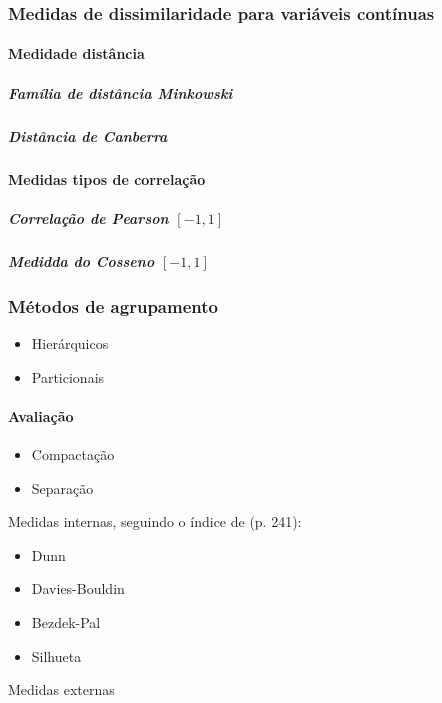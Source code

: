 \subsubsection{Medidas de dissimilaridade para variáveis contínuas}

\paragraph*{Medidade distância}
\subparagraph*{Família de distância Minkowski}
\subparagraph*{Distância de Canberra}

\paragraph*{Medidas tipos de correlação}

\subparagraph*{Correlação de Pearson $ [-1,1] $}
\subparagraph*{Medidda do Cosseno $ [-1,1] $}


\subsubsection{Métodos de agrupamento}

\begin{itemize}
    \item Hierárquicos
    \item Particionais
\end{itemize}


\paragraph*{Avaliação}

\begin{itemize}
    \item Compactação
    \item Separação
\end{itemize}


Medidas internas, seguindo o índice de (p. 241):

\begin{itemize}
    \item Dunn
    \item Davies-Bouldin
    \item Bezdek-Pal
    \item Silhueta
\end{itemize}

Medidas externas